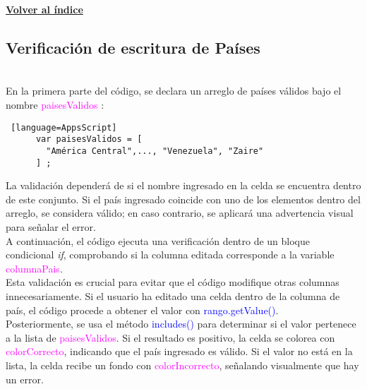 \documentclass[12pt]{article} %
\begin{document}
        


            \begin{flushright}
                \hyperlink{toc}{\textbf{Volver al índice}}
            \end{flushright}


    

    \subsection*{Verificación de escritura de Países}
    \\
    

    En la primera parte del código, se declara un arreglo de países válidos bajo el nombre \textcolor{magenta}{paisesValidos} :

    \begin{lstlisting} [language=AppsScript]
      var paisesValidos = [
        "América Central",..., "Venezuela", "Zaire"
      ] ;
    \end{lstlisting} 
    
    La validación dependerá de si el nombre ingresado en la celda se encuentra dentro de este conjunto. Si el país ingresado coincide con uno de los elementos dentro del arreglo, se considera válido; en caso contrario, se aplicará una advertencia visual para señalar el error. \\

    

    A continuación, el código ejecuta una verificación dentro de un bloque condicional \textit{if}, comprobando si la columna editada corresponde a la variable \textcolor{magenta}{columnaPais}. \\
    
    Esta validación es crucial para evitar que el código modifique otras columnas innecesariamente. Si el usuario ha editado una celda dentro de la columna de país, el código procede a obtener el valor con \textcolor{blue}{rango.getValue()}. \\
    
    Posteriormente, se usa el método \textcolor{blue}{includes()} para determinar si el valor pertenece a la lista de \textcolor{magenta}{paisesValidos}. Si el resultado es positivo, la celda se colorea con \textcolor{magenta}{colorCorrecto}, indicando que el país ingresado es válido. Si el valor no está en la lista, la celda recibe un fondo con \textcolor{magenta}{colorIncorrecto}, señalando visualmente que hay un error. \\
    
\end{document}
